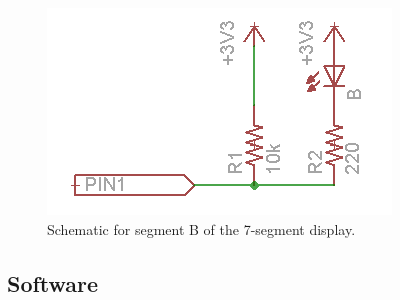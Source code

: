 \documentclass[11pt]{article}
\begin{document}
\begin{figure}[h!]
\centering
\includegraphics[scale=0.7]{single_led.png}
\caption{Schematic for segment B of the 7-segment display.}
\label{figure:single_led}
\end{figure} 


\subsection{Software}
\end{document}
